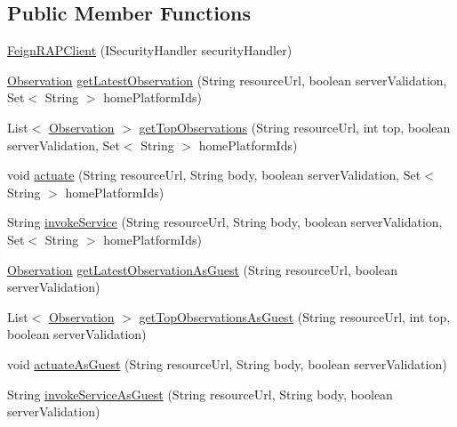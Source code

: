 \subsection*{Public Member Functions}
\begin{DoxyCompactItemize}
\item 
\hyperlink{classeu_1_1h2020_1_1symbiote_1_1client_1_1feign_1_1FeignRAPClient_a2f8dadf98d938c436073ce8bc41e12a9}{Feign\+R\+A\+P\+Client} (I\+Security\+Handler security\+Handler)
\item 
\hyperlink{classeu_1_1h2020_1_1symbiote_1_1model_1_1cim_1_1Observation}{Observation} \hyperlink{classeu_1_1h2020_1_1symbiote_1_1client_1_1feign_1_1FeignRAPClient_a8fa05eec693745963abed21675111189}{get\+Latest\+Observation} (String resource\+Url, boolean server\+Validation, Set$<$ String $>$ home\+Platform\+Ids)
\item 
List$<$ \hyperlink{classeu_1_1h2020_1_1symbiote_1_1model_1_1cim_1_1Observation}{Observation} $>$ \hyperlink{classeu_1_1h2020_1_1symbiote_1_1client_1_1feign_1_1FeignRAPClient_a3d6649ccc28b76d9fe638263554e6eaf}{get\+Top\+Observations} (String resource\+Url, int top, boolean server\+Validation, Set$<$ String $>$ home\+Platform\+Ids)
\item 
void \hyperlink{classeu_1_1h2020_1_1symbiote_1_1client_1_1feign_1_1FeignRAPClient_a0f3a3716d99f7cdb647226b1f63adba7}{actuate} (String resource\+Url, String body, boolean server\+Validation, Set$<$ String $>$ home\+Platform\+Ids)
\item 
String \hyperlink{classeu_1_1h2020_1_1symbiote_1_1client_1_1feign_1_1FeignRAPClient_ae654c725a70a82e9d7d44a213b5953c8}{invoke\+Service} (String resource\+Url, String body, boolean server\+Validation, Set$<$ String $>$ home\+Platform\+Ids)
\item 
\hyperlink{classeu_1_1h2020_1_1symbiote_1_1model_1_1cim_1_1Observation}{Observation} \hyperlink{classeu_1_1h2020_1_1symbiote_1_1client_1_1feign_1_1FeignRAPClient_a32b3832b72beec30c0ae51f12449c5cf}{get\+Latest\+Observation\+As\+Guest} (String resource\+Url, boolean server\+Validation)
\item 
List$<$ \hyperlink{classeu_1_1h2020_1_1symbiote_1_1model_1_1cim_1_1Observation}{Observation} $>$ \hyperlink{classeu_1_1h2020_1_1symbiote_1_1client_1_1feign_1_1FeignRAPClient_add8a361e9f735b829fafa453d42886e6}{get\+Top\+Observations\+As\+Guest} (String resource\+Url, int top, boolean server\+Validation)
\item 
void \hyperlink{classeu_1_1h2020_1_1symbiote_1_1client_1_1feign_1_1FeignRAPClient_a95d854a5611ef1e052b8353906c35d4e}{actuate\+As\+Guest} (String resource\+Url, String body, boolean server\+Validation)
\item 
String \hyperlink{classeu_1_1h2020_1_1symbiote_1_1client_1_1feign_1_1FeignRAPClient_a9fe8b1ee6c3474be2be5720a7cd3813d}{invoke\+Service\+As\+Guest} (String resource\+Url, String body, boolean server\+Validation)
\end{DoxyCompactItemize}


